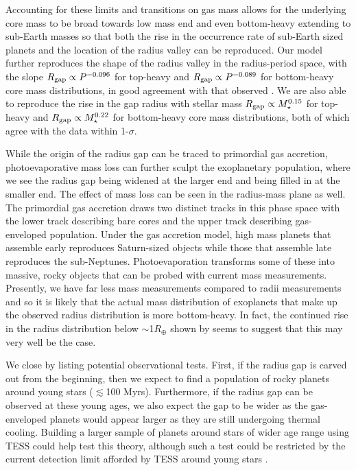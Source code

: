 \documentclass[twocolumn]{aastex631}
\begin{document}
Accounting for these limits and transitions on gas mass allows for the underlying core mass to be broad towards low mass end and even bottom-heavy extending to sub-Earth masses so that both the rise in the occurrence rate of sub-Earth sized planets and the location of the radius valley \citep{Hsu19} can be reproduced. Our model further reproduces the shape of the radius valley in the radius-period space, with the slope $R_{\rm gap} \propto P^{-0.096}$ for top-heavy and $R_{\rm gap} \propto P^{-0.089}$ for bottom-heavy core mass distributions, in good agreement with that observed \citep{vanEylen18,Martinez19}. We are also able to reproduce the rise in the gap radius with stellar mass $R_{\rm gap} \propto M_\star^{0.15}$ for top-heavy and $R_{\rm gap} \propto M_\star^{0.22}$ for bottom-heavy core mass distributions, both of which agree with the data \citep{Berger20,Petigura22} within 1-$\sigma$.

While the origin of the radius gap can be traced to primordial gas accretion, photoevaporative mass loss can further sculpt the exoplanetary population, where we see the radius gap being widened at the larger end and being filled in at the smaller end. The effect of mass loss can be seen in the radius-mass plane as well. The primordial gas accretion draws two distinct tracks in this phase space with the lower track describing bare cores and the upper track describing gas-enveloped population. Under the gas accretion model, high mass planets that assemble early reproduces Saturn-sized objects while those that assemble late reproduces the sub-Neptunes. Photoevaporation transforms some of these into massive, rocky objects that can be probed with current mass measurements. Presently, we have far less mass measurements compared to radii measurements and so it is likely that the actual mass distribution of exoplanets that make up the observed radius distribution is more bottom-heavy. In fact, the continued rise in the radius distribution below $\sim$1$R_\oplus$ shown by \citet{Hsu19} seems to suggest that this may very well be the case.

We close by listing potential observational tests. First, if the radius gap is carved out from the beginning, then we expect to find a population of rocky planets around young stars ($\lesssim$100 Myrs). Furthermore, if the radius gap can be observed at these young ages, we also expect the gap to be wider as the gas-enveloped planets would appear larger as they are still undergoing thermal cooling. Building a larger sample of planets around stars of wider age range using TESS could help test this theory, although such a test could be restricted by the current detection limit afforded by TESS around young stars \citep[e.g.,][]{Newton19,Zhou21}.
\end{document}
